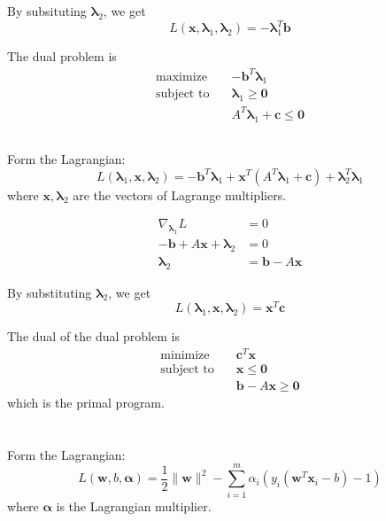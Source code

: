 \documentclass{article}[11pt]
\begin{document}
\subsection{}
By subsituting $\boldsymbol{\lambda}_2$, we get
\[ L(\mathbf{x}, \boldsymbol{\lambda}_1, \boldsymbol{\lambda}_2) = -\boldsymbol{\lambda}_1^T \mathbf{b} \]

The dual problem is
\begin{align*}
  \text{maximize} \quad & -\mathbf{b}^T \boldsymbol{\lambda}_1\\
    \text{subject to} \quad & \boldsymbol{\lambda}_1 \ge \mathbf{0} \\ 
  & A^T \boldsymbol{\lambda}_1 + \mathbf{c} \le \mathbf{0}
\end{align*}

\subsection{}
Form the Lagrangian:
\[
  L(\boldsymbol{\lambda}_1, \mathbf{x}, \boldsymbol{\lambda}_2) = -\mathbf{b}^T\boldsymbol{\lambda}_1 + \mathbf{x}^T (A^T \boldsymbol{\lambda}_1 + \mathbf{c}) + \boldsymbol{\lambda}_2^T \boldsymbol{\lambda}_1
\]
where $\mathbf{x}, \boldsymbol{\lambda}_2$ are the vectors of Lagrange multipliers.

\begin{align*}
  \nabla_{\boldsymbol{\lambda}_1} L &= 0 \\
  -\mathbf{b} + A \mathbf{x} + \boldsymbol{\lambda}_2 &= 0 \\
  \boldsymbol{\lambda}_2 &= \mathbf{b} - A \mathbf{x}
\end{align*}

By substituting $\boldsymbol{\lambda}_2$, we get
\[
  L(\boldsymbol{\lambda}_1, \mathbf{x}, \boldsymbol{\lambda}_2) = \mathbf{x}^T \mathbf{c}
\]

The dual of the dual problem is
\begin{align*}
  \text{minimize} \quad & \mathbf{c}^T \mathbf{x}\\
    \text{subject to} \quad & \mathbf{x} \le \mathbf{0} \\ 
  & \mathbf{b} - A \mathbf{x} \ge \mathbf{0}
\end{align*}
which is the primal program.

\section{}
Form the Lagrangian:
\[ L(\mathbf{w}, b, \boldsymbol{\alpha}) = \frac{1}{2} \lVert \mathbf{w} \rVert^2 - \sum_{i=1}^{m} \alpha_i (y_i (\mathbf{w}^T \mathbf{x}_i - b) - 1) \]
where $\boldsymbol{\alpha}$ is the Lagrangian multiplier.
\end{document}
